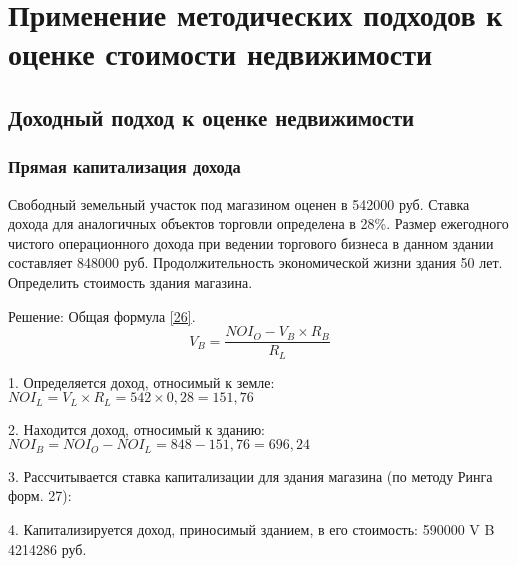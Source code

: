 \section{Применение методических подходов к оценке стоимости недвижимости}
\subsection{Доходный подход к оценке недвижимости}
\subsubsection{Прямая капитализация дохода}

Свободный земельный участок под магазином оценен в 542000 руб. 
Ставка дохода для аналогичных объектов торговли определена в 28\%.
Размер ежегодного чистого операционного дохода при ведении торгового бизнеса в данном здании составляет 848000 руб.
Продолжительность экономической жизни здания 50 лет.
Определить стоимость здания магазина.

Решение: Общая формула \ref{26}.
\begin{equation}\label{26}
V_B = \dfrac{NOI_O - V_B \times R_B}{R_L}
\end{equation}

1. Определяется доход, относимый к земле:
$ NOI_L = V_L \times R_L = 542 \times 0,28 = 151,76 $

2. Находится доход, относимый к зданию:
$ NOI_B = NOI_O - NOI_L = 848 - 151,76 =696,24 $

3. Рассчитывается ставка капитализации для здания магазина (по методу Ринга форм. 27):

4. Капитализируется доход, приносимый зданием, в его стоимость:
590000
V B 
 4214286 руб.